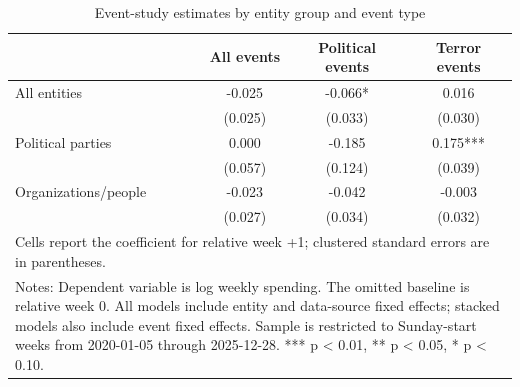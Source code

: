 \begin{table}[!htbp]
\centering
\caption{Event-study estimates by entity group and event type}
\label{tab:event_study_key_results_plus1}
\begin{tabular}{lccc}
\hline\hline
 & All events & Political events & Terror events \\
\hline
All entities & -0.025 & -0.066* & 0.016 \\
 & (0.025) & (0.033) & (0.030) \\
Political parties & 0.000 & -0.185 & 0.175*** \\
 & (0.057) & (0.124) & (0.039) \\
Organizations/people & -0.023 & -0.042 & -0.003 \\
 & (0.027) & (0.034) & (0.032) \\
\hline
\multicolumn{4}{l}{\footnotesize Cells report the coefficient for relative week +1; clustered standard errors are in parentheses.}\\
\multicolumn{4}{l}{\footnotesize Notes: Dependent variable is log weekly spending. The omitted baseline is relative week 0. All models include entity and data-source fixed effects; stacked models also include event fixed effects. Sample is restricted to Sunday-start weeks from 2020-01-05 through 2025-12-28. *** p < 0.01, ** p < 0.05, * p < 0.10.}\\
\hline\hline
\end{tabular}
\end{table}
